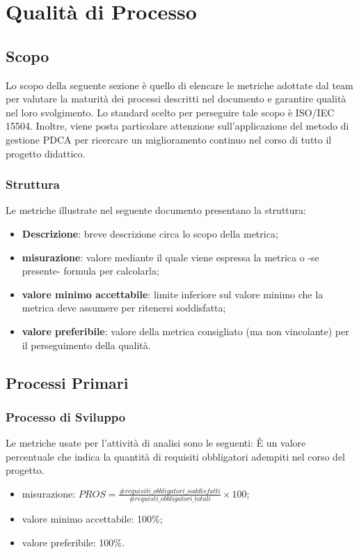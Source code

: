 \section{Qualità di Processo}

\subsection{Scopo}
Lo scopo della seguente sezione è quello di elencare le metriche adottate dal team \Gruppo{} per valutare la maturità dei processi descritti nel documento \textit{\NdP} e garantire qualità nel loro svolgimento. Lo standard scelto per perseguire tale scopo è ISO/IEC 15504. Inoltre, viene posta particolare attenzione sull'applicazione del metodo di gestione PDCA per ricercare un miglioramento continuo nel corso di tutto il progetto didattico.

\subsubsection{Struttura}
Le metriche illustrate nel seguente documento presentano la struttura:
\begin{itemize}
	\item{\textbf{Descrizione}: breve descrizione circa lo scopo della metrica;}
	\item{\textbf{misurazione}: valore mediante il quale viene espressa la metrica o -se presente- formula per calcolarla;}
	\item{\textbf{valore minimo accettabile}: limite inferiore sul valore minimo che la metrica deve assumere per ritenersi soddisfatta;}
	\item{\textbf{valore preferibile}: valore della metrica consigliato (ma non vincolante) per il perseguimento della qualità.}
\end{itemize}

\subsection{Processi Primari}

	\subsubsection{Processo di Sviluppo}
	
		Le metriche usate per l'attività di analisi sono le seguenti:
			È un valore percentuale che indica la quantità di requisiti obbligatori adempiti nel corso del progetto.
		\begin{itemize}
			\item{misurazione: $PROS = \displaystyle\frac{\#requisiti\_obbligatori\_soddisfatti}{\#requisti\_obbligatori\_totali} \times 100$;}
			\item{valore minimo accettabile: 100\%;}
			\item{valore preferibile: 100\%.}
		\end{itemize}

